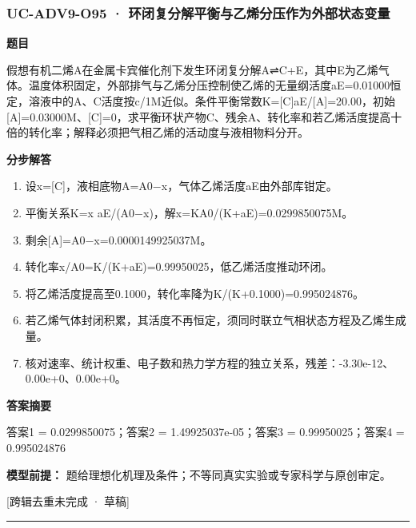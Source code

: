 \documentclass[UTF8,11pt,a4paper]{ctexart}
\begin{document}
\subsubsection*{UC-ADV9-O95 · 环闭复分解平衡与乙烯分压作为外部状态变量}
\noindent\textbf{题目}\par
假想有机二烯A在金属卡宾催化剂下发生环闭复分解A⇌C+E，其中E为乙烯气体。温度体积固定，外部排气与乙烯分压控制使乙烯的无量纲活度aE=0.01000恒定，溶液中的A、C活度按c/1M近似。条件平衡常数K=[C]aE/[A]=20.00，初始[A]=0.03000M、[C]=0，求平衡环状产物C、残余A、转化率和若乙烯活度提高十倍的转化率；解释必须把气相乙烯的活动度与液相物料分开。\par
\medskip\noindent\textbf{分步解答}
\begin{enumerate}
\item 设x=[C]，液相底物A=A0−x，气体乙烯活度aE由外部库钳定。
\item 平衡关系K=x aE/(A0−x)，解x=KA0/(K+aE)=0.0299850075M。
\item 剩余[A]=A0−x=0.0000149925037M。
\item 转化率x/A0=K/(K+aE)=0.99950025，低乙烯活度推动环闭。
\item 将乙烯活度提高至0.1000，转化率降为K/(K+0.1000)=0.995024876。
\item 若乙烯气体封闭积累，其活度不再恒定，须同时联立气相状态方程及乙烯生成量。
\item 核对速率、统计权重、电子数和热力学方程的独立关系，残差：-3.30e-12、0.00e+0、0.00e+0。
\end{enumerate}
\noindent\textbf{答案摘要}\par
答案1 = 0.0299850075；答案2 = 1.49925037e-05；答案3 = 0.99950025；答案4 = 0.995024876\par
\noindent\textbf{模型前提：}
题给理想化机理及条件；不等同真实实验或专家科学与原创审定。\par
\noindent\textcolor{red!65!black}{[跨辑去重未完成 · 草稿]} \par
\medskip\hrule\medskip
{}
\end{document}
